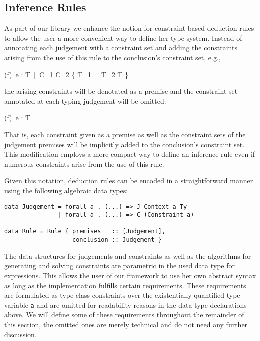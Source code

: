 \subsection{Inference Rules}
\label{sec:inference_rules}

As part of our library we enhance the notion for constraint-based
deduction rules to allow the user a more convenient way to define her
type system. Instead of annotating each judgement with a constraint
set and adding the constraints arising from the use of this rule to
the conclusion's constraint set, e.g.,

              { \Gamma \vdash (f)\, e : T\ |\
                C_1 \cup C_2 \cup \{ T_1 = T_2 \rightarrow T \} }

the arising constraints will be denotated as a premise and the
constraint set annotated at each typing judgement will be omitted:

\infrule[App] { \Gamma \vdash f : T_1 \andalso \Gamma \vdash e : T_2
                \andalso T_1 = T_2 \rightarrow T }
              { \Gamma \vdash (f)\, e : T }

That is, each constraint given as a premise as well as the constraint
sets of the judgement premises will be implicitly added to the
conclusion's constraint set. This modification employs a more compact 
way to define an inference rule even if numerous constraints arise
from the use of this rule.

Given this notation, deduction rules can be encoded in a
straightforward manner using the following algebraic data types:
\begin{lstlisting}
data Judgement = forall a . (...) => J Context a Ty
               | forall a . (...) => C (Constraint a)

data Rule = Rule { premises   :: [Judgement],
                   conclusion :: Judgement }
\end{lstlisting}
The data structures for judgements and constraints as well as the
algorithms for generating and solving constraints are parametric in
the used data type for expressions. This allows the user of our
framework to use her own abstract syntax as long as the implementation
fulfills certain requirements. These requirements are formulated as
type class constraints over the existentially quantified type variable
\texttt{a} and are omitted for readability reasons in the data type
declarations above. We will define some of these requirements
throughout the remainder of this section, the omitted ones are merely
technical and do not need any further discussion.

